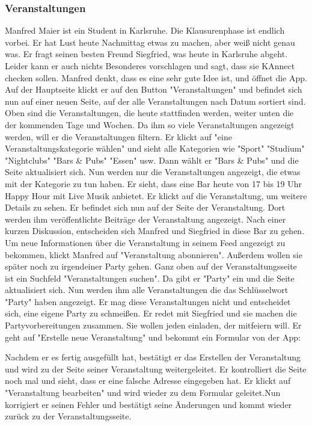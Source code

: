 \documentclass[parskip=full]{scrartcl}
\begin{document}
		\subsubsection{Veranstaltungen}
		Manfred Maier ist ein Student in Karlsruhe. Die Klausurenphase ist endlich vorbei. Er hat Lust heute Nachmittag etwas zu machen, aber weiß nicht genau was. Er fragt seinen besten Freund Siegfried, was heute in Karlsruhe abgeht. Leider kann er auch nichts Besonderes vorschlagen und sagt, dass sie KAnnect checken sollen. Manfred denkt, dass es eine sehr gute Idee ist, und öffnet die App.
		Auf der Hauptseite klickt er auf den Button "Veranstaltungen" und befindet sich nun auf einer neuen Seite, auf der alle Veranstaltungen nach Datum sortiert sind. Oben sind die Veranstaltungen, die heute stattfinden werden, weiter unten die der kommenden Tage und Wochen.
		Da ihm so viele Veranstaltungen angezeigt werden, will er die Veranstaltungen filtern. Er klickt auf "eine Veranstaltungskategorie wählen" und sieht alle Kategorien wie "Sport" "Studium" "Nightclubs" "Bars \& Pubs" "Essen" usw. 
		Dann wählt er "Bars \& Pubs" und die Seite aktualisiert sich. Nun werden nur die Veranstaltungen angezeigt, die etwas mit der Kategorie zu tun haben.
		Er sieht, dass eine Bar heute von 17 bis 19 Uhr Happy Hour mit Live Musik anbietet. Er klickt auf die Veranstaltung, um weitere Details zu sehen. Er befindet sich nun auf der Seite der Veranstaltung. Dort werden ihm veröffentlichte Beiträge der Veranstaltung angezeigt. Nach einer kurzen Diskussion, entscheiden sich Manfred und Siegfried in diese Bar zu gehen. Um neue Informationen über die Veranstaltung in seinem Feed angezeigt zu bekommen, klickt Manfred auf "Veranstaltung abonnieren". Außerdem wollen sie später noch zu irgendeiner Party gehen. Ganz oben auf der Veranstaltungsseite ist ein Suchfeld "Veranstaltungen suchen". Da gibt er "Party" ein und die Seite aktualisiert sich. Nun werden ihm alle Veranstaltungen die das Schlüsselwort "Party" haben angezeigt. Er mag diese Veranstaltungen nicht und entscheidet sich, eine eigene Party zu schmeißen. Er redet mit Siegfried und sie machen die Partyvorbereitungen zusammen. Sie wollen jeden einladen, der mitfeiern will. Er geht auf "Erstelle neue Veranstaltung" und bekommt ein Formular von der App: 
		
		
		Nachdem er es fertig ausgefüllt hat, bestätigt er das Erstellen der Veranstaltung und wird zu der Seite seiner Veranstaltung weitergeleitet. Er kontrolliert die Seite noch mal und sieht, dass er eine falsche Adresse eingegeben hat. Er klickt auf "Veranstaltung bearbeiten" und wird wieder zu dem Formular geleitet.Nun korrigiert er seinen Fehler und bestätigt seine Änderungen und kommt wieder zurück zu der Veranstaltungsseite.
		
\end{document}
